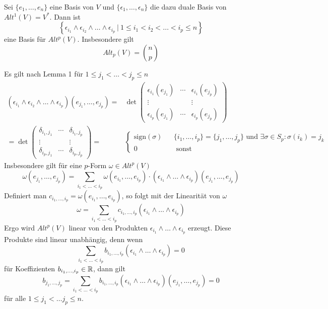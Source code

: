 \Lem{}
Sei $\{e_1, \ldots, e_n\}$ eine Basis von $V$ und $\{\epsilon_1, \ldots, \epsilon_n\}$ die dazu duale Basis von $Alt^1(V) = V^*$. Dann ist
\[ \left\lbrace\epsilon_{i_1} \wedge \epsilon_{i_2} \wedge \ldots \wedge \epsilon_{i_p} ~|~ 1 \leq i_1 < i_2 < \ldots < i_p \leq n \right\rbrace\]
eine Basis für $Alt^p(V)$. Insbesondere gilt
\[ Alt_p(V) = \binom{n}{p} \]
\begin{Beweis}{}
Es gilt nach Lemma 1 für $1 \leq j_1< \ldots < j_p \leq n$
\begin{align*}
(\epsilon_{i_1} \wedge \epsilon_{i_2} \wedge \ldots \wedge \epsilon_{i_p})(e_{j_1},\ldots, e_{j_p})
=&
\det \left(
\begin{matrix}
\epsilon_{i_1}(e_{j_1}) & \cdots & \epsilon_{i_1}(e_{j_p})\\
\vdots & & \vdots\\
\epsilon_{i_p}(e_{j_1}) & \cdots & \epsilon_{i_p}(e_{j_p})
\end{matrix}
\right)\\
=
\det \left(
\begin{matrix}
\delta_{i_1,j_1} & \cdots & \delta_{i_1,j_p}\\
\vdots & & \vdots\\
\delta_{i_p,j_1} & \cdots & \delta_{i_p,j_p}
\end{matrix}
\right)
=& \left\lbrace
\begin{aligned}
\text{sign}(\sigma) && \{i_1, \ldots, i_p\} = \{j_1, \ldots, j_p \} \text{ und } \exists \sigma \in S_p : \sigma(i_k) = j_k\\
0 && \text{ sonst}
\end{aligned}
\right.
\end{align*}
Insbesondere gilt für eine $p$-Form $\omega \in Alt^p(V)$
\[ \omega(e_{j_1}, \ldots, e_{j_p}) = \sum_{i_1<\ldots < i_p} \omega(e_{i_1},\ldots, e_{i_p}) \cdot (\epsilon_{i_1} \wedge \ldots \wedge \epsilon_{i_p})(e_{j_1}, \ldots, e_{j_p}) \]
Definiert man $c_{i_1, \ldots, i_p} = \omega(e_{i_1},\ldots, e_{i_p})$, so folgt mit der Linearität von $\omega$
\[ \omega = \sum_{i_1 < \ldots <i_p}c_{i_1, \ldots, i_p} (\epsilon_{i_1} \wedge \ldots \wedge \epsilon_{i_p})  \]
Ergo wird $Alt^p(V)$ linear von den Produkten $\epsilon_{i_1} \wedge \ldots \wedge \epsilon_{i_p}$ erzeugt. Diese Produkte sind linear unabhängig, denn wenn
\[\sum_{i_1 < \ldots <i_p}b_{i_1, \ldots, i_p} (\epsilon_{i_1} \wedge \ldots \wedge \epsilon_{i_p})= 0\]
für Koeffizienten $b_{i_1, \ldots, i_p} \in \mathbb{R}$, dann gilt
\[ b_{j_1, \ldots, j_p} = \sum_{i_1 < \ldots <i_p}b_{i_1, \ldots, i_p} (\epsilon_{i_1} \wedge \ldots \wedge \epsilon_{i_p})(e_{j_1}, \ldots, e_{j_p}) = 0 \]
für alle $1 \leq j_1<\ldots j_p\leq n$.
\end{Beweis}

